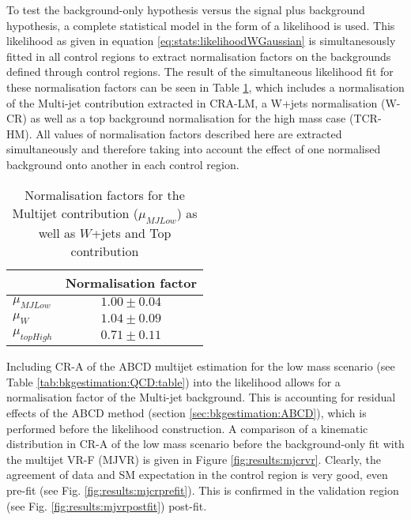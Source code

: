 \FloatBarrier
To test the background-only hypothesis versus the signal plus background hypothesis, a complete statistical model in the form of a likelihood is used. This likelihood as given in equation \eqref{eq:stats:likelihoodWGaussian} is simultanesously fitted in all control regions to extract normalisation factors on the backgrounds defined through control regions. 
The result of the simultaneous likelihood fit for these normalisation factors can be seen in Table \ref{tab:C1N2SSNormFactors}, which includes a normalisation of the Multi-jet contribution extracted in CRA-LM,  a W+jets normalisation (W-CR) as well as a top background normalisation for the high mass case (TCR-HM). 
All values of normalisation factors described here are extracted simultaneously and therefore taking into account the effect of one normalised background onto another in each control region.  %

\begin{table}[h]\centering
\begin{tabular}{|l|c|} \hline
&Normalisation factor \\ \hline
$\mu_{MJLow} $& $1.00 \pm  0.04$\\
$\mu_W       $& $1.04 \pm 0.09  $\\
$\mu_{topHigh } $& $0.71 \pm 0.11$\\ \hline
\end{tabular}
\caption{Normalisation factors for the Multijet contribution ($\mu_{MJLow}$) as well as $W$+jets and Top contribution \label{tab:C1N2SSNormFactors}}
\end{table}

Including CR-A of the ABCD multijet estimation for the low mass scenario (see Table \ref{tab:bkgestimation:QCD:table}) into the likelihood allows for a normalisation factor of the Multi-jet background. This is accounting for residual effects of the ABCD method (section \ref{sec:bkgestimation:ABCD}),  which is performed before the likelihood construction.
A comparison of a kinematic distribution in CR-A  of the low mass scenario before the background-only fit with the multijet VR-F (MJVR) is given in Figure \ref{fig:results:mjcrvr}. Clearly,  the agreement of data and \ac{SM} expectation in the control region is very good,  even pre-fit (see Fig. \ref{fig:results:mjcrprefit}).  This is confirmed in the validation region (see Fig. \ref{fig:results:mjvrpostfit}) post-fit.   

